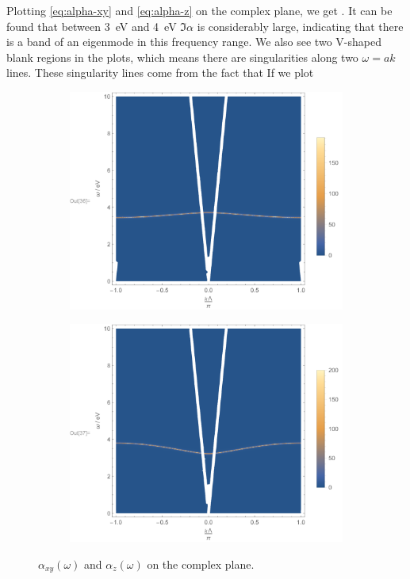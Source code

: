 \documentclass[hyperref, a4paper]{article}
\begin{document}
Plotting \eqref{eq:alpha-xy} and \eqref{eq:alpha-z} on the complex plane, we get .
It can be found that between \SI{3}{eV} and \SI{4}{eV} $\Im \alpha$ is considerably large, indicating that 
there is a band of an eigenmode in this frequency range. We also see two V-shaped blank regions in the plots,
which means there are singularities along two $\omega=ak$ lines. These singularity lines come from the fact 
that 
If we plot 

\begin{figure}
    \centering
    \begin{subfigure}{0.45\textwidth}
        \includegraphics[width=\textwidth]{alphaxy-complex-plane.pdf}
    \end{subfigure}
    \begin{subfigure}{0.45\textwidth}
        \includegraphics[width=\textwidth]{alphaz-complex-plane.pdf}
    \end{subfigure}
    \caption{$\alpha_{xy}(\omega)$ and $\alpha_z(\omega)$ on the complex plane. }
    \label{fig:complex-plane}
\end{figure} 
\end{document}

